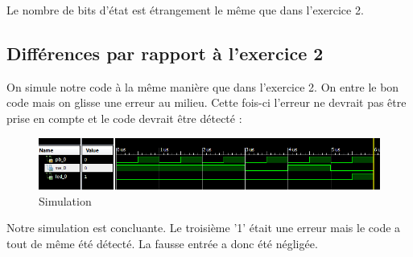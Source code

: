 \noindent Le nombre de bits d'état est étrangement le même que dans l'exercice 2.

\subsection{Différences par rapport à l'exercice 2}

On simule notre code à la même manière que dans l'exercice 2. On entre le bon code mais on glisse une erreur au milieu. Cette fois-ci l'erreur ne devrait pas être prise en compte et le code devrait être détecté :
\begin{figure}[!h]
   \centering\includegraphics[width=\textwidth]{files/tp2_3/simu_erreur.png}
   \caption{Simulation}
\end{figure}

Notre simulation est concluante. Le troisième '1' était une erreur mais le code a tout de même été détecté. La fausse entrée a donc été négligée.